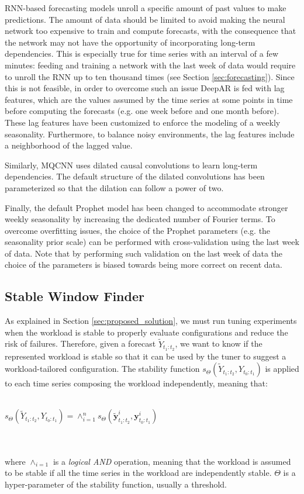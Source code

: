\documentclass[a4paper, 12pt]{article} %
\begin{document}
	RNN-based forecasting models unroll a specific amount of past values to make predictions. The amount of data should be limited to avoid making the neural network too expensive to train and compute forecasts, with the consequence that the network may not have the opportunity of incorporating long-term dependencies. This is especially true for time series with an interval of a few minutes: feeding and training a network with the last week of data would require to unroll the RNN up to ten thousand times (see Section \ref{sec:forecasting}). Since this is not feasible, in order to overcome such an issue DeepAR is fed with lag features, which are the values assumed by the time series at some points in time before computing the forecasts (e.g. one week before and one month before). These lag features have been customized to enforce the modeling of a weekly seasonality. Furthermore, to balance noisy environments, the lag features include a neighborhood of the lagged value.
	
	Similarly, MQCNN uses dilated causal convolutions to learn long-term dependencies. The default structure of the dilated convolutions has been parameterized so that the dilation can follow a power of two.
	
	Finally, the default Prophet model has been changed to accommodate stronger weekly seasonality by increasing the dedicated number of Fourier terms. To overcome overfitting issues, the choice of the Prophet parameters (e.g. the seasonality prior scale) can be performed with cross-validation using the last week of data. Note that by performing such validation on the last week of data the choice of the parameters is biased towards being more correct on recent data.
	
	\subsection{Stable Window Finder} \label{ssec:stable_window_finder}	
	As explained in Section \ref{sec:proposed_solution}, we must run tuning experiments when the workload is stable to properly evaluate configurations and reduce the risk of failures.
	Therefore, given a forecast $\tilde{Y}_{t_1:t_2}$, we want to know if the represented workload is stable so that it can be used by the tuner to suggest a workload-tailored configuration.
	The stability function $s_\Theta(\tilde{Y}_{t_1:t_2}, Y_{t_0:t_1})$ is applied to each time series composing the workload independently, meaning that:\\\\
	\centerline{
		$
		s_\Theta(\tilde{Y}_{t_1:t_2}, Y_{t_0:t_1}) = \wedge_{i=1} ^n s_\Theta(\tilde{\pmb{y}}_{t_1:t_2}^i, \pmb{y}_{t_0:t_1}^i)
		$
	}\\\\ 
	where $ \wedge_{i=1}$ is a \textit{logical AND} operation, meaning that the workload is assumed to be stable if all the time series in the workload are independently stable. $\Theta$ is a hyper-parameter of the stability function, usually a threshold.
	
\end{document}
